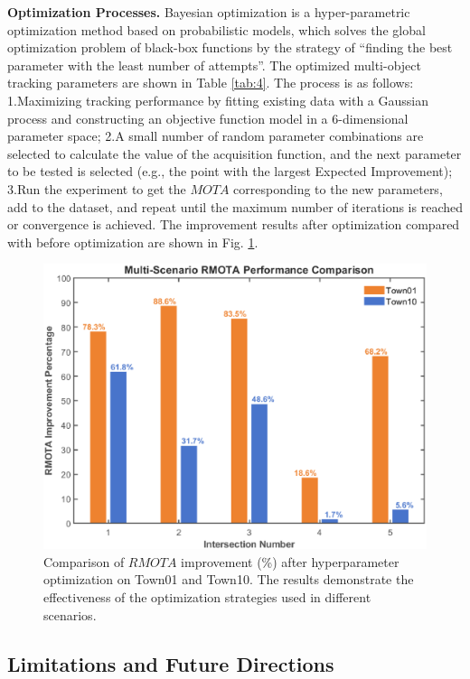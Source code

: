 \documentclass[journal,twoside,web]{ieeecolor}
\begin{document}
\textbf{Optimization Processes.}
Bayesian optimization is a hyper-parametric optimization method based on probabilistic models, which solves the global optimization problem of black-box functions by the strategy of “finding the best parameter with the least number of attempts”.
The optimized multi-object tracking parameters are shown in Table \ref{tab:4}.
The process is as follows:
1.Maximizing tracking performance by fitting existing data with a Gaussian process and constructing an objective function model in a 6-dimensional parameter space; 
2.A small number of random parameter combinations are selected to calculate the value of the acquisition function, and the next parameter to be tested is selected (e.g., the point with the largest Expected Improvement); 
3.Run the experiment to get the \(MOTA\) corresponding to the new parameters, add to the dataset, and repeat until the maximum number of iterations is reached or convergence is achieved.
The improvement results after optimization compared with before optimization are shown in Fig. \ref{fig:4}.   
\begin{figure}[!t]
	\centerline{\includegraphics[width=\columnwidth]{picture/picture4.eps}}
	\caption{Comparison of \(RMOTA\) improvement (\%) after hyperparameter optimization on Town01 and Town10. The results demonstrate the effectiveness of the optimization strategies used in different scenarios.} 
	\label{fig:4} 
\end{figure}

\subsection{Limitations and Future Directions}
\end{document}
